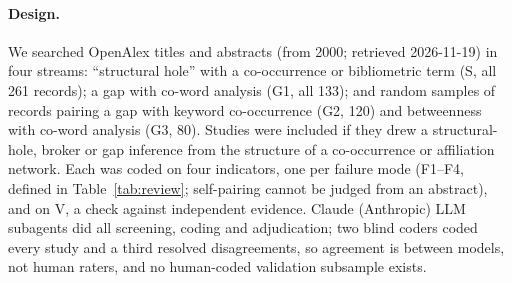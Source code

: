\paragraph{Design.} We searched OpenAlex titles and abstracts (from 2000; retrieved 2026-11-19) in four streams: ``structural hole'' with a co-occurrence or bibliometric term (S, all 261 records); a gap with co-word analysis (G1, all 133); and random samples of records pairing a gap with keyword co-occurrence (G2, 120) and betweenness with co-word analysis (G3, 80). Studies were included if they drew a structural-hole, broker or gap inference from the structure of a co-occurrence or affiliation network. Each was coded on four indicators, one per failure mode (F1--F4, defined in Table~\ref{tab:review}; self-pairing cannot be judged from an abstract), and on V, a check against independent evidence. Claude (Anthropic) LLM subagents did all screening, coding and adjudication; two blind coders coded every study and a third resolved disagreements, so agreement is between models, not human raters, and no human-coded validation subsample exists.

